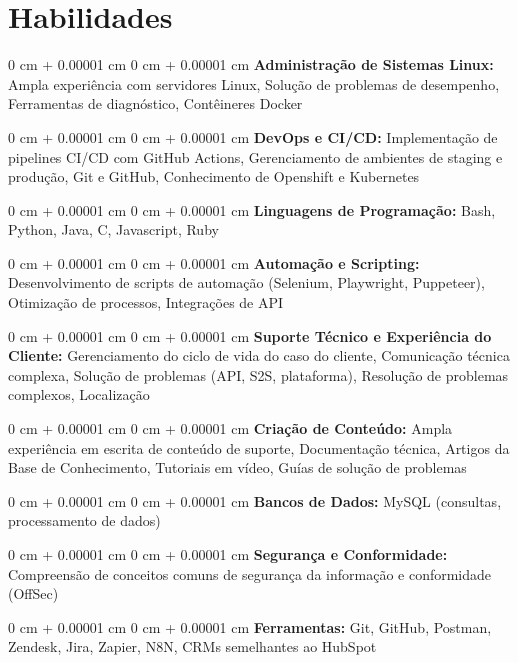 \documentclass[10pt, letterpaper]{article}
\newenvironment{onecolentry}{
    \begin{adjustwidth}{
        0 cm + 0.00001 cm
    }{
        0 cm + 0.00001 cm
    }
}{
    \end{adjustwidth}
}
\begin{document}
\section{Habilidades}
\begin{onecolentry}{\textbf{Administração de Sistemas Linux:} Ampla experiência com servidores Linux, Solução de problemas de desempenho, Ferramentas de diagnóstico, Contêineres Docker}\end{onecolentry}
\vspace{0.1cm}
\begin{onecolentry}{\textbf{DevOps e CI/CD:} Implementação de pipelines CI/CD com GitHub Actions, Gerenciamento de ambientes de staging e produção, Git e GitHub, Conhecimento de Openshift e Kubernetes}\end{onecolentry}
\vspace{0.1cm}
\begin{onecolentry}{\textbf{Linguagens de Programação:} Bash, Python, Java, C, Javascript, Ruby}\end{onecolentry}
\vspace{0.1cm}
\begin{onecolentry}{\textbf{Automação e Scripting:} Desenvolvimento de scripts de automação (Selenium, Playwright, Puppeteer), Otimização de processos, Integrações de API}\end{onecolentry}
\vspace{0.1cm}
\begin{onecolentry}{\textbf{Suporte Técnico e Experiência do Cliente:} Gerenciamento do ciclo de vida do caso do cliente, Comunicação técnica complexa, Solução de problemas (API, S2S, plataforma), Resolução de problemas complexos, Localização}\end{onecolentry}
\vspace{0.1cm}
\begin{onecolentry}{\textbf{Criação de Conteúdo:} Ampla experiência em escrita de conteúdo de suporte, Documentação técnica, Artigos da Base de Conhecimento, Tutoriais em vídeo, Guías de solução de problemas}\end{onecolentry}
\vspace{0.1cm}
\begin{onecolentry}{\textbf{Bancos de Dados:} MySQL (consultas, processamento de dados)}\end{onecolentry}
\vspace{0.1cm}
\begin{onecolentry}{\textbf{Segurança e Conformidade:} Compreensão de conceitos comuns de segurança da informação e conformidade (OffSec)}\end{onecolentry}
\vspace{0.1cm}
\begin{onecolentry}{\textbf{Ferramentas:} Git, GitHub, Postman, Zendesk, Jira, Zapier, N8N, CRMs semelhantes ao HubSpot}\end{onecolentry}
\end{document}
